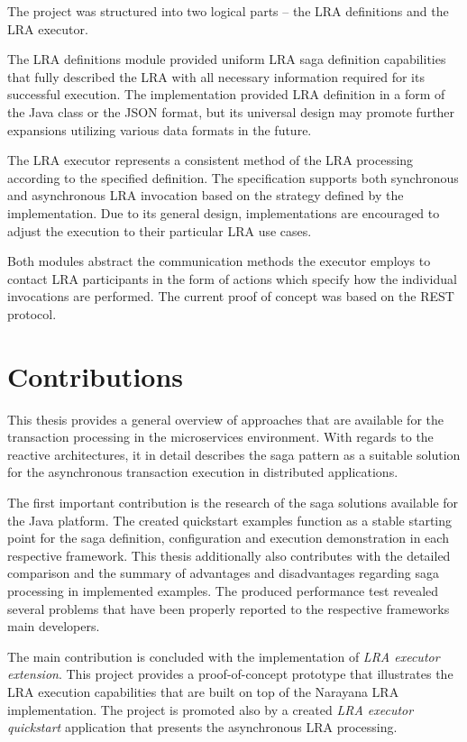 \documentclass[oneside,
  digital, %
  table,   %
  lof,     %
  lot,     %
]{fithesis3}
\begin{document}
The project was structured into two logical parts -- the LRA definitions and the LRA executor.

The LRA definitions module provided uniform LRA saga definition capabilities that fully described the LRA with all necessary information required for its successful execution. The implementation provided LRA definition in a form of the Java class or the JSON format, but its universal design may promote further expansions utilizing various data formats in the future. 

The LRA executor represents a consistent method of the LRA processing according to the specified definition. The specification supports both synchronous and asynchronous LRA invocation based on the strategy defined by the implementation. Due to its general design, implementations are encouraged to adjust the execution to their particular LRA use cases.

Both modules abstract the communication methods the executor employs to contact LRA participants in the form of actions which specify how the individual invocations are performed. The current proof of concept was based on the REST protocol.

\section{Contributions}

This thesis provides a general overview of approaches that are available for the transaction processing in the microservices environment. With regards to the reactive architectures, it in detail describes the saga pattern as a suitable solution for the asynchronous transaction execution in distributed applications.

The first important contribution is the research of the saga solutions available for the Java platform. The created quickstart examples function as a stable starting point for the saga definition, configuration and execution demonstration in each respective framework. This thesis additionally also contributes with the detailed comparison and the summary of advantages and disadvantages regarding saga processing in implemented examples. The produced performance test revealed several problems that have been properly reported to the respective frameworks main developers.

The main contribution is concluded with the implementation of \textit{LRA executor extension}. This project provides a proof-of-concept prototype that illustrates the LRA execution capabilities that are built on top of the Narayana LRA implementation. The project is promoted also by a created \textit{LRA executor quickstart} application that presents the asynchronous LRA processing.
\end{document}
